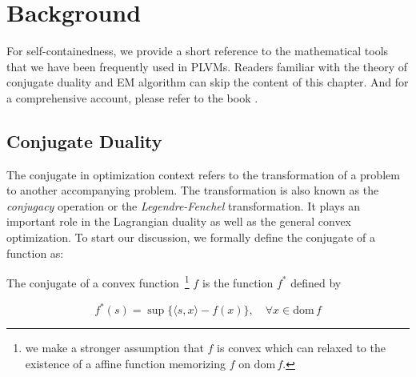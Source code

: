 \chapter{Background} \label{chp::bg}

For self-containedness, we provide a short reference to the mathematical tools
that we have been frequently used in PLVMs. Readers familiar with the theory of
conjugate duality and EM algorithm can skip the content of this chapter. And for
a comprehensive account, please refer to the book \cite{hiriart1993convex}.

\section{Conjugate Duality}

The conjugate in optimization context refers to the transformation of a problem
to another accompanying problem. The transformation is also known as the
\emph{conjugacy} operation or the \emph{Legendre-Fenchel} transformation.  It
plays an important role in the Lagrangian duality as well as the general convex
optimization. To start our discussion, we formally define the conjugate of a
function as:

\begin{dfn}

  The conjugate of a convex function~\footnote{we make a stronger assumption
  that $f$ is convex which can relaxed to the existence of a affine function
  memorizing $f$ on $\mathrm{dom}\, f$.} $f$ is the function $f^*$ defined by

  \begin{equation}
    f^*(s) = \sup \{ \langle s, x \rangle - f(x) \}, \quad
    \forall x \in \mathrm{dom}\, f
  \end{equation}

\end{dfn}


